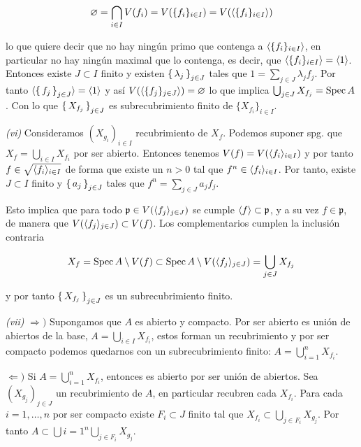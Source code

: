 \documentclass[../main.tex]{subfiles}
\begin{document}
\begin{equation}
  \varnothing = \bigcap_{i\in I} V(f_i) = V(\{f_i\}_{i\in I}) = V(\langle \{f_i\}_{i\in I} \rangle)
\end{equation}

lo que quiere decir que no hay ningún primo que contenga a $\langle \{f_i\}_{i\in I} \rangle$, en particular no hay ningún maximal que lo contenga, es decir, que $\langle \{f_i\}_{i\in I} \rangle = \langle 1 \rangle$. Entonces existe $J\subset I$ finito y existen $\set{\lambda_j}_{j\in J}$ tales que $1 = \sum_{j\in J} \lambda_j f_j$.
Por tanto $\langle  \set{f_j}_{j\in J} \rangle = \langle  1 \rangle$ y así  $V(\langle \{f_j\}_{j\in J} \rangle )= \varnothing$ lo que implica $\bigcup_{j\in J} X_{f_j} = \operatorname{Spec} A$. Con lo que $\set{X_{f_j}}_{j\in J}$ es subrecubrimiento finito de $\{X_{f_i}\}_{i\in I}$.

\textit{(vi)} Consideramos $(X_{g_i})_{i\in I}$ recubrimiento de $X_f$. Podemos suponer spg. que $X_f = \bigcup_{i\in I} X_{f_i}$ por ser abierto. Entonces tenemos $V(f) = V(\langle f_i \rangle_{i\in I})$ y por tanto $f\in \sqrt{\langle f_i \rangle_{i\in I}}$ de forma que existe un $n>0$ tal que $f^n \in \langle f_i \rangle_{i\in I}$.
Por tanto, existe $J\subset I$ finito y $\set{a_j}_{j\in J}$ tales que $f^n = \sum_{j\in J}a_j f_j$.

Esto implica que para todo $\mathfrak p \in  V(\langle f_j \rangle_{j\in J})$ se cumple $\langle f \rangle \subset \mathfrak p$, y a su vez $f \in \mathfrak p$, de manera que $ V(\langle f_j \rangle_{j\in J}) \subset V(f)$. Los complementarios cumplen la inclusión contraria

\[ X_f = \operatorname{Spec} A \setminus V(f) \subset \operatorname{Spec} A \setminus V(\langle f_j \rangle_{j\in J}) = \bigcup_{j\in J} X_{f_j} \]

y por tanto $\set{X_{f_j}}_{j\in J}$ es un subrecubrimiento finito.

\textit{(vii)} $\Rightarrow)$ Supongamos que $A$ es abierto y compacto. Por ser abierto es unión de abiertos de la base, $A=\bigcup_{i\in I}X_{f_i}$, estos forman un recubrimiento y por ser compacto podemos quedarnos con un subrecubrimiento finito: $A=\bigcup_{i=1}^n X_{f_i}$.

$\Leftarrow)$ Si $A=\bigcup_{i=1}^n X_{f_i}$, entonces es abierto por ser unión de abiertos. Sea $(X_{g_j})_{j\in J}$ un recubrimiento de $A$, en particular recubren cada $X_{f_i}$. Para cada $i=1,\dots, n$ por ser compacto existe $F_i \subset J$ finito tal que $X_{f_i}\subset \bigcup_{j \in F_i} X_{g_j}$. Por tanto $A \subset \bigcup{i=1}^n \bigcup_{j \in F_i} X_{g_j}$.
\end{document}
